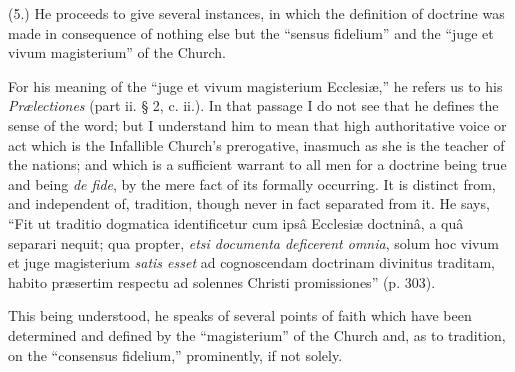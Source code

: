 (5.) He proceeds to give several instances, in
which the definition of doctrine was made in consequence of nothing else
but the ``sensus fidelium'' and the ``juge et vivum magisterium'' of the
Church.

For his meaning of the ``juge et vivum magisterium
Ecclesiæ,'' he refers us to his \emph{Prælectiones} (part ii. § 2, c.
ii.). In that passage I do not see that he defines the sense of the
word; but I understand him to mean that high authoritative voice or act
which is the Infallible Church's prerogative, inasmuch as she is the
teacher of the nations; and which is a sufficient warrant to all men for
a doctrine being true and being \emph{de fide}, by the mere fact of its
formally occurring. It is distinct from, and independent of, tradition,
though never in fact separated from it. He says, ``Fit ut traditio
dogmatica identificetur cum ipsâ Ecclesiæ doctninâ, a quâ separari
nequit; qua propter, \emph{etsi documenta deficerent omnia}, solum hoc
vivum et juge magisterium \emph{satis esset} ad cognoscendam doctrinam
divinitus traditam, habito præsertim respectu ad solennes Christi
promissiones'' (p. 303).

This being understood, he speaks of several points
of faith which have been determined and defined by the ``magisterium'' of
the Church and, as to tradition, on the ``consensus fidelium,''
prominently, if not solely.


